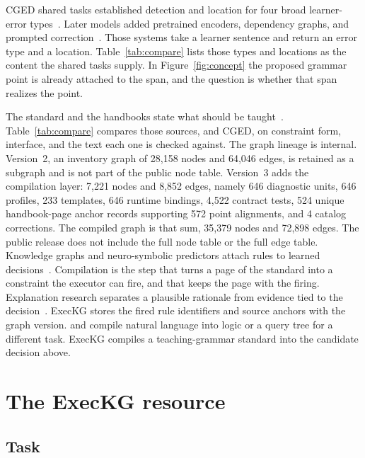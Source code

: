 \documentclass[pdflatex,sn-mathphys,NameDate]{sn-jnl}
\begin{document}
CGED shared tasks established detection and location for four broad learner-error types~\citep{yu2014overview,rao2017ijcnlp}.
Later models added pretrained encoders, dependency graphs, and prompted correction~\citep{liang2020bert,luo2020graph,mu2024llm}.
Those systems take a learner sentence and return an error type and a location.
Table~\ref{tab:compare} lists those types and locations as the content the shared tasks supply.
In Figure~\ref{fig:concept} the proposed grammar point is already attached to the span, and the question is whether that span realizes the point.

The standard and the handbooks state what should be taught~\citep{moe2021gf,cti2022handbooks,wang2023syllabus,jin2021principles}.
Table~\ref{tab:compare} compares those sources, and CGED, on constraint form, interface, and the text each one is checked against.
The graph lineage is internal.
Version~2, an inventory graph of 28,158 nodes and 64,046 edges, is retained as a subgraph and is not part of the public node table.
Version~3 adds the compilation layer: 7,221 nodes and 8,852 edges, namely 646 diagnostic units, 646 profiles, 233 templates, 646 runtime bindings, 4,522 contract tests, 524 unique handbook-page anchor records supporting 572 point alignments, and 4 catalog corrections.
The compiled graph is that sum, 35,379 nodes and 72,898 edges.
The public release does not include the full node table or the full edge table.
Knowledge graphs and neuro-symbolic predictors attach rules to learned decisions~\citep{hogan2021kg,hu2016rules}.
Compilation is the step that turns a page of the standard into a constraint the executor can fire, and that keeps the page with the firing.
Explanation research separates a plausible rationale from evidence tied to the decision~\citep{fei2023explanations,jacovi2020faithfulness,lyu2024faithful}.
ExecKG stores the fired rule identifiers and source anchors with the graph version.
\citet{olausson2023linc} and \citet{zhang2025qcompiler} compile natural language into logic or a query tree for a different task.
ExecKG compiles a teaching-grammar standard into the candidate decision above.

\section{The ExecKG resource}
\label{sec:resource}

\subsection{Task}
\label{sec:task}
\end{document}
